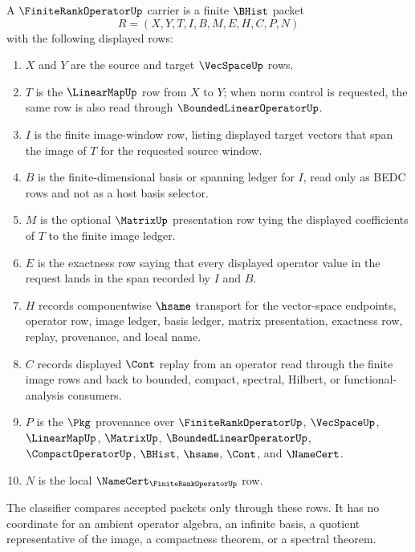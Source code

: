 \begin{definition}
\label{def:finite-rank-operator-carrier}
A $\FiniteRankOperatorUp$ carrier is a finite $\BHist$ packet
$$
R=(X,Y,T,I,B,M,E,H,C,P,N)
$$
with the following displayed rows:
\begin{enumerate}
\item $X$ and $Y$ are the source and target $\VecSpaceUp$ rows.
\item $T$ is the $\LinearMapUp$ row from $X$ to $Y$; when norm control is requested, the same row is also read through $\BoundedLinearOperatorUp$.
\item $I$ is the finite image-window row, listing displayed target vectors that span the image of $T$ for the requested source window.
\item $B$ is the finite-dimensional basis or spanning ledger for $I$, read only as BEDC rows and not as a host basis selector.
\item $M$ is the optional $\MatrixUp$ presentation row tying the displayed coefficients of $T$ to the finite image ledger.
\item $E$ is the exactness row saying that every displayed operator value in the request lands in the span recorded by $I$ and $B$.
\item $H$ records componentwise $\hsame$ transport for the vector-space endpoints, operator row, image ledger, basis ledger, matrix presentation, exactness row, replay, provenance, and local name.
\item $C$ records displayed $\Cont$ replay from an operator read through the finite image rows and back to bounded, compact, spectral, Hilbert, or functional-analysis consumers.
\item $P$ is the $\Pkg$ provenance over $\FiniteRankOperatorUp$, $\VecSpaceUp$, $\LinearMapUp$, $\MatrixUp$, $\BoundedLinearOperatorUp$, $\CompactOperatorUp$, $\BHist$, $\hsame$, $\Cont$, and $\NameCert$.
\item $N$ is the local $\NameCert_{\FiniteRankOperatorUp}$ row.
\end{enumerate}
The classifier compares accepted packets only through these rows. It has no coordinate for an ambient operator algebra, an infinite basis, a quotient representative of the image, a compactness theorem, or a spectral theorem.
\end{definition}

